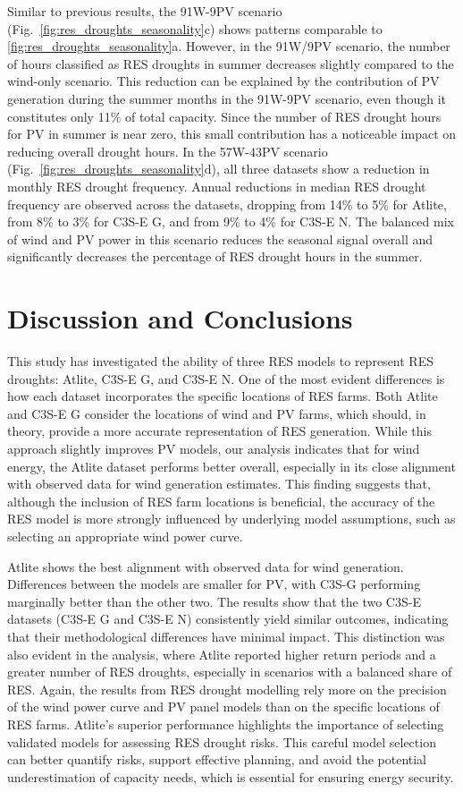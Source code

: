 \documentclass[preprint, 12pt, authoryear]{elsarticle}
\begin{document}
Similar to previous results, the 91W-9PV scenario (Fig.~\ref{fig:res_droughts_seasonality}c) shows patterns comparable to \ref{fig:res_droughts_seasonality}a. However, in the 91W/9PV scenario, the number of hours classified as RES droughts in summer decreases slightly compared to the wind-only scenario. This reduction can be explained by the contribution of PV generation during the summer months in the 91W-9PV scenario, even though it constitutes only 11\% of total capacity. Since the number of RES drought hours for PV in summer is near zero, this small contribution has a noticeable impact on reducing overall drought hours. In the 57W-43PV scenario (Fig.~\ref{fig:res_droughts_seasonality}d), all three datasets show a reduction in monthly RES drought frequency. Annual reductions in median RES drought frequency are observed across the datasets, dropping from 14\% to 5\% for Atlite, from 8\% to 3\% for C3S-E G, and from 9\% to 4\% for C3S-E N. The balanced mix of wind and PV power in this scenario reduces the seasonal signal overall and significantly decreases the percentage of RES drought hours in the summer.

\newpage
\section{Discussion and Conclusions}
\label{sec:Conclusion}

This study has investigated the ability of three RES models to represent RES droughts: Atlite, C3S-E G, and C3S-E N. One of the most evident differences is how each dataset incorporates the specific locations of RES farms. Both Atlite and C3S-E G consider the locations of wind and PV farms, which should, in theory, provide a more accurate representation of RES generation. While this approach slightly improves PV models, our analysis indicates that for wind energy, the Atlite dataset performs better overall, especially in its close alignment with observed data for wind generation estimates. This finding suggests that, although the inclusion of RES farm locations is beneficial, the accuracy of the RES model is more strongly influenced by underlying model assumptions, such as selecting an appropriate wind power curve.

Atlite shows the best alignment with observed data for wind generation. Differences between the models are smaller for PV, with C3S-G performing marginally better than the other two. The results show that the two C3S-E datasets (C3S-E G and C3S-E N) consistently yield similar outcomes, indicating that their methodological differences have minimal impact. This distinction was also evident in the analysis, where Atlite reported higher return periods and a greater number of RES droughts, especially in scenarios with a balanced share of RES. Again, the results from RES drought modelling rely more on the precision of the wind power curve and PV panel models than on the specific locations of RES farms. Atlite’s superior performance highlights the importance of selecting validated models for assessing RES drought risks. This careful model selection can better quantify risks, support effective planning, and avoid the potential underestimation of capacity needs, which is essential for ensuring energy security.
\end{document}
